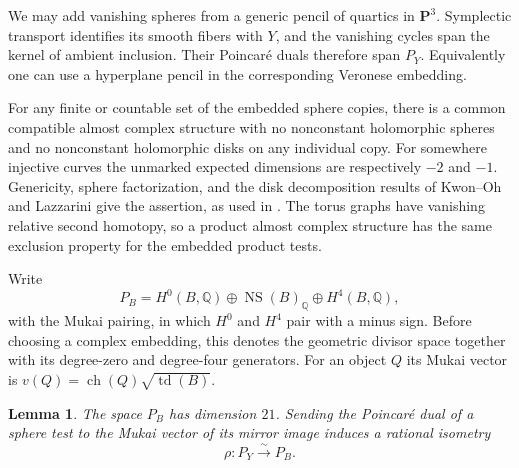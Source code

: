\documentclass[11pt]{article}
\numberwithin{equation}{section}
\newtheorem{lemma}[theorem]{Lemma}
\theoremstyle{definition}
\theoremstyle{remark}
\newcommand{\Q}{\mathbb Q}
\DeclareMathOperator{\NS}{NS}
\begin{document}
We may add vanishing spheres from a generic pencil of quartics in
$\mathbf P^3$.  Symplectic transport identifies its smooth fibers with
$Y$, and the vanishing cycles span the kernel of ambient inclusion.
Their Poincar\'e duals therefore span $P_Y$.  Equivalently one can use
a hyperplane pencil in the corresponding Veronese embedding.

For any finite or countable set of the embedded sphere copies, there is
a common compatible almost complex structure with no nonconstant
holomorphic spheres and no nonconstant holomorphic disks on any
individual copy.  For somewhere injective curves the unmarked expected
dimensions are respectively $-2$ and $-1$.  Genericity, sphere
factorization, and the disk decomposition results of Kwon--Oh and
Lazzarini \cite{KwonOh,Lazzarini} give the assertion, as used in
\cite[Section~8]{SeidelQuartic}.  The torus graphs have vanishing relative
second homotopy, so a product almost complex structure has the same
exclusion property for the embedded product tests.

Write
\begin{equation}
 P_B=H^0(B,\Q)\oplus\NS(B)_{\Q}\oplus H^4(B,\Q),
 \label{setup:algebraic-mukai}
\end{equation}
with the Mukai pairing, in which $H^0$ and $H^4$ pair with a minus sign.
Before choosing a complex embedding, this denotes the geometric divisor
space together with its degree-zero and degree-four generators.
For an object $Q$ its Mukai vector is
$v(Q)=\operatorname{ch}(Q)\sqrt{\operatorname{td}(B)}$.

\begin{lemma}
\label{setup:rho-lemma}
The space $P_B$ has dimension $21$.  Sending the Poincar\'e dual of a
sphere test to the Mukai vector of its mirror image induces a rational
isometry
\begin{equation}
 \rho:P_Y\xrightarrow{\sim}P_B.
 \label{setup:rho}
\end{equation}
\end{lemma}
\end{document}
